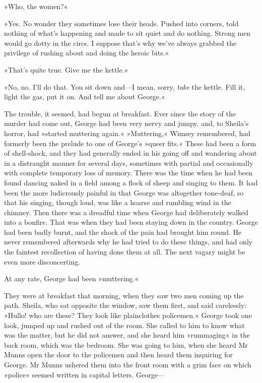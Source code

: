 »Who, the women?«

»Yes. No wonder they sometimes lose their heads. Pushed into corners, told nothing of what's happening and made to sit quiet and do nothing. Strong men would go dotty in the circs. I suppose that's why we've always grabbed the privilege of rushing about and doing the heroic bits.«

»That's quite true. Give me the kettle.«

»No, no. I'll do that. You sit down and—I mean, sorry, \textit{take} the kettle. Fill it, light the gas, put it on. And tell me about George.«

The trouble, it seemed, had begun at breakfast. Ever since the story of the murder had come out, George had been very nervy and jumpy, and, to Sheila's horror, had »started muttering again.« »Muttering,« Wimsey remembered, had formerly been the prelude to one of George's »queer fits.« These had been a form of shell-shock, and they had generally ended in his going off and wandering about in a distraught manner for several days, sometimes with partial and occasionally with complete temporary loss of memory. There was the time when he had been found dancing naked in a field among a flock of sheep and singing to them. It had been the more ludicrously painful in that George was altogether tone-deaf, so that his singing, though loud, was like a hoarse and rumbling wind in the chimney. Then there was a dreadful time when George had deliberately walked into a bonfire. That was when they had been staying down in the country. George had been badly burnt, and the shock of the pain had brought him round. He never remembered afterwards why he had tried to do these things, and had only the faintest recollection of having done them at all. The next vagary might be even more disconcerting.

At any rate, George had been »muttering.«

They were at breakfast that morning, when they saw two men coming up the path. Sheila, who sat opposite the window, saw them first, and said carelessly: »Hullo! who are these? They look like plainclothes policemen.« George took one look, jumped up and rushed out of the room. She called to him to know what was the matter, but he did not answer, and she heard him »rummaging« in the back room, which was the bedroom. She was going to him, when she heard Mr Munns open the door to the policemen and then heard them inquiring for George. Mr Munns ushered them into the front room with a grim face on which »police« seemed written in capital letters. George—

